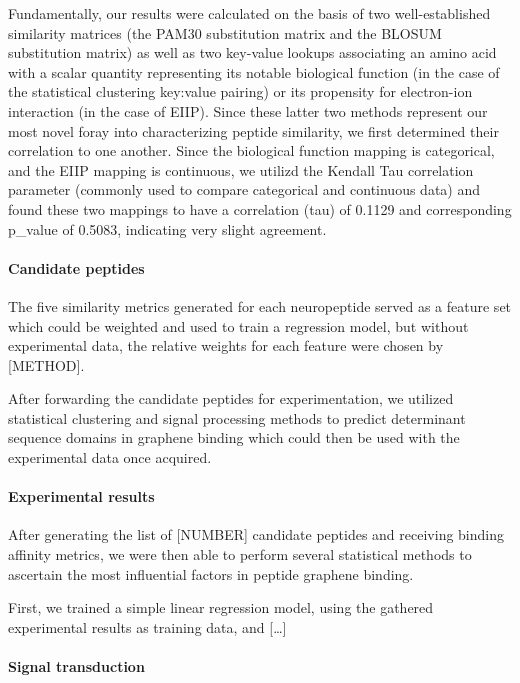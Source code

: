 \documentclass[]{article}
\let\oldparagraph\paragraph
\renewcommand{\paragraph}[1]{\oldparagraph{#1}\mbox{}}
\begin{document}
Fundamentally, our results were calculated on the basis of two well-established similarity matrices (the PAM30 substitution matrix and the BLOSUM substitution matrix) as well as two key-value lookups associating an amino acid with a scalar quantity representing its notable biological function (in the case of the statistical clustering key:value pairing) or its propensity for electron-ion interaction (in the case of EIIP). Since these latter two methods represent our most novel foray into characterizing peptide similarity, we first determined their correlation to one another. Since the biological function mapping is categorical, and the EIIP mapping is continuous, we utilizd the Kendall Tau correlation parameter (commonly used to compare categorical and continuous data) and found these two mappings to have a correlation (tau) of 0.1129 and corresponding p\_value of 0.5083, indicating very slight agreement.

\hypertarget{candidate-peptides}{%
\paragraph{Candidate peptides}\label{candidate-peptides}}

The five similarity metrics generated for each neuropeptide served as a
feature set which could be weighted and used to train a regression
model, but without experimental data, the relative weights for each
feature were chosen by {[}METHOD{]}.

After forwarding the candidate peptides for experimentation, we utilized
statistical clustering and signal processing methods to predict
determinant sequence domains in graphene binding which could then be
used with the experimental data once acquired.

\hypertarget{experimental-results}{%
\paragraph{Experimental results}\label{experimental-results}}

After generating the list of {[}NUMBER{]} candidate peptides and
receiving binding affinity metrics, we were then able to perform several
statistical methods to ascertain the most influential factors in peptide
graphene binding.

First, we trained a simple linear regression model, using the gathered
experimental results as training data, and {[}\ldots{}{]}

\hypertarget{signal-transduction}{%
\paragraph{Signal transduction}\label{signal-transduction}}
\end{document}
